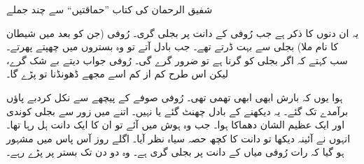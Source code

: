 \documentclass{article}
\begin{document}

   \begin{center} \Large          %
      شفیق الرحمان کی کتاب ''حماقتیں`` سے چند جملے
   \end{center}
   \vspace{2\baselineskip}    %

   یہ ان دنوں کا ذکر ہے جب رُوفی کے دانت پر بجلی گری۔ رُوفی (جن کو بعد میں شیطان کا نام ملا) بجلی سے بہت ڈرتے تھے۔ جب بادل آتے تو وہ بستروں میں چھپتے پھرتے۔ سب کہتے کہ اگر بجلی کو گرنا ہے تو ضرور گرے گی۔ رُوفی جواب دیتے بے شک گرے، لیکن اس طرح کم از کم اسے مجھے ڈھونڈنا تو پڑے گا۔
   
   ہوا یوں کہ بارش ابھی ابھی تھمی تھی۔ رُوفی صوفے کے پیچھے سے نکل کردبے پاؤں برآمدے تک گئے۔ یہ دیکھنے کے بادل چھنٹ گئے یا نہیں۔ اتنے میں زور سے بجلی کوندی اور ایک عظیم الشان دھماکا ہوا۔ جب وہ ہوش میں آئے تو ان کا ایک دانت ہل رہا تھا۔ انہوں نے آئینہ دیکھا تو دانت کا کچھ حصہ سیاہ نظر آیا۔ اگلے روز آس پاس میں مشہور ہو گیا کہ رات رُوفی میاں کے دانت پر بجلی گری ہے۔ وہ دو دن تک بستر پر پڑے رہے۔
\end{document}
